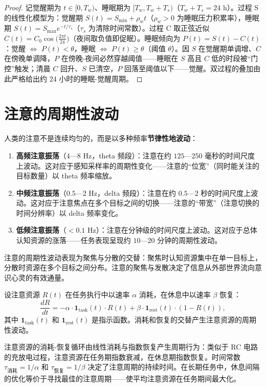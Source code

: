 \begin{proof}
记觉醒期为 $t \in [0, T_w)$、睡眠期为 $[T_w, T_w + T_s)$（$T_w + T_s = 24$ h）。过程 S 的线性化模型为：觉醒期 $S(t) = S_{\min} + \rho_w t$（$\rho_w > 0$ 为睡眠压力积累率），睡眠期 $S(t) = S_{\max} e^{-t/\tau_s}$（$\tau_s$ 为清除时间常数）。过程 C 取正弦近似 $C(t) = C_0 \cos\!\big(\tfrac{2\pi t}{24}\big)$（夜间取负值即促眠）。睡眠倾向为 $P(t) = S(t) - C(t)$：觉醒 $\Leftrightarrow$ $P(t) < \theta$，睡眠 $\Leftrightarrow$ $P(t) \ge \theta$（阈值 $\theta$）。因 $S$ 在觉醒期单调增、$C$ 在傍晚单调降，$P$ 在傍晚-夜间必然穿越阈值——睡眠在 $S$ 高且 $C$ 低的时段被“门控”触发；清晨 $C$ 回升、$S$ 已清空，$P$ 回落至阈值以下——觉醒。双过程的叠加由此严格给出约 24 小时的睡眠-觉醒周期。
\end{proof}

\section{注意的周期性波动}

\begin{definition}[注意的振荡]\label{def:attention_oscillation}
人类的注意不是连续均匀的，而是以多种频率\textbf{节律性地波动}：
\begin{enumerate}[label=(\roman*)]
    \item \textbf{高频注意振荡}（$4$—$8$ Hz，theta 频段）：注意在约 $125$—$250$ 毫秒的时间尺度上波动。这对应于感知采样率的周期性变化——注意的“位宽”（同时能关注的目标数量）以 theta 频率缩放。
    \item \textbf{中频注意振荡}（$0.5$—$2$ Hz，delta 频段）：注意在约 $0.5$—$2$ 秒的时间尺度上波动。这对应于注意焦点在多个目标之间的切换——注意的“带宽”（注意切换的时间分辨率）以 delta 频率变化。
    \item \textbf{低频注意振荡}（$<0.1$ Hz）：注意在分钟级的时间尺度上波动。这对应于总体认知资源的涨落——任务表现呈现约 $10$—$20$ 分钟的周期性波动。
\end{enumerate}
注意的周期性波动表现为聚焦与分散的交替：聚焦时认知资源集中在单一目标上，分散时资源在多个目标之间分布。注意的聚焦与发散决定了信息从外部世界流向意识心灵的有效通量。
\end{definition}

\begin{proposition}[注意资源消耗与恢复模型]\label{prop:attention_resource}
设注意资源 $R(t)$ 在任务执行中以速率 $\alpha$ 消耗，在休息中以速率 $\beta$ 恢复：
\[
\frac{dR}{dt} = -\alpha \cdot \mathbf{1}_{\text{task}}(t) \cdot R(t) + \beta \cdot \mathbf{1}_{\text{rest}}(t) \cdot (1 - R(t)),
\]
其中 $\mathbf{1}_{\text{task}}(t)$ 和 $\mathbf{1}_{\text{rest}}(t)$ 是指示函数。消耗和恢复的交替产生注意资源的周期性波动。

注意资源的消耗-恢复循环由线性消耗与指数恢复产生周期行为：类似于 RC 电路的充放电过程，注意资源在任务期指数衰减，在休息期指数恢复。时间常数 $\tau_{\text{消耗}} = 1/\alpha$ 和 $\tau_{\text{恢复}} = 1/\beta$ 决定了注意周期的持续时间。在长期任务中，休息间隔的优化等价于寻找最佳的注意周期——使平均注意资源在任务期间最大化。
\end{proposition}

